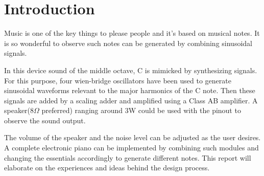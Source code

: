 \section{Introduction}
Music is one of the key things to please people and it’s based on musical notes. It is so wonderful to observe such notes can be generated by combining sinusoidal signals.
\par
In this device sound of the middle octave, C is mimicked by synthesizing signals. For this purpose, four wien-bridge oscillators have been used to generate sinusoidal waveforms relevant to the major harmonics of the C note. Then these signals are added by a scaling adder and amplified using a Class AB amplifier. A speaker(8$\Omega$ preferred) ranging around 3W could be used with the pinout to observe the sound output.
\par
The volume of the speaker and the noise level can be adjusted as the user desires. A complete electronic piano can be implemented by combining such modules and changing the essentials accordingly to generate different notes. This report will elaborate on the experiences and ideas behind the design process.